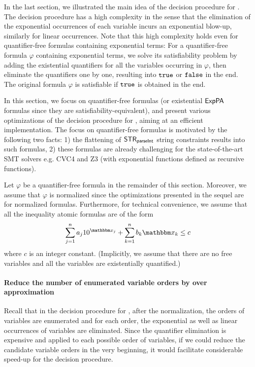 
In the last section, we illustrated the main idea of the decision procedure for  {\paexp}. The decision procedure has a high complexity in the sense that the elimination of the exponential occurrences   of each variable incurs an exponential blow-up, similarly for linear occurrences. Note that this high complexity holds even for quantifier-free formulas containing exponential terms: For a quantifier-free formula $\varphi$ containing exponential terms, we solve its satisfiability problem by adding the existential quantifiers for all the variables occurring in $\varphi$, then eliminate the quantifiers one by one, resulting into $\mathtt{true}$ or $\mathtt{false}$ in the end. The original formula $\varphi$ is satisfiable if $\mathtt{true}$ is obtained in the end.

In this section, we focus on quantifier-free {\paexp} formulas (or existential {${\sf ExpPA}$} formulas since they are satisfiability-equivalent), and present various optimizations of the decision procedure for {\paexp}, aiming at an efficient implementation. The focus on quantifier-free {\paexp} formulas is motivated by the following two facts: 1) the flattening of {${\sf STR}_{\textsf{parseInt}}$} string constraints results into such formulas, 2) these formulas are already challenging for the state-of-the-art SMT solvers e.g. CVC4 and Z3 (with exponential functions defined as recursive functions). 

Let $\varphi$ be a quantifier-free {\paexp} formula in the remainder of this section. Moreover, we assume that $\varphi$ is normalized since the optimizations presented in the sequel are for normalized formulas. Furthermore, for technical convenience, we assume that all the inequality atomic formulas are of the form 
%
\[\sum_{j=1}^{n} a_j 10^{\ivarx_{j}} + \sum_{k=1}^{n}b_k \ivarx_{k} \le c\]
%
where $c$ is an integer constant. (Implicitly, we assume that there are no free variables and all the variables are existentially quantified.)

\paragraph{Reduce the number of enumerated variable orders by over approximation}

Recall that in the decision procedure for {\paexp}, after the normalization, the orders of variables are enumerated and for each order, the exponential as well as linear occurrences of variables are eliminated. Since the quantifier elimination is expensive and applied to each possible order of variables, if we could reduce the candidate variable orders in the very beginning, it would facilitate considerable speed-up for the decision procedure. 

